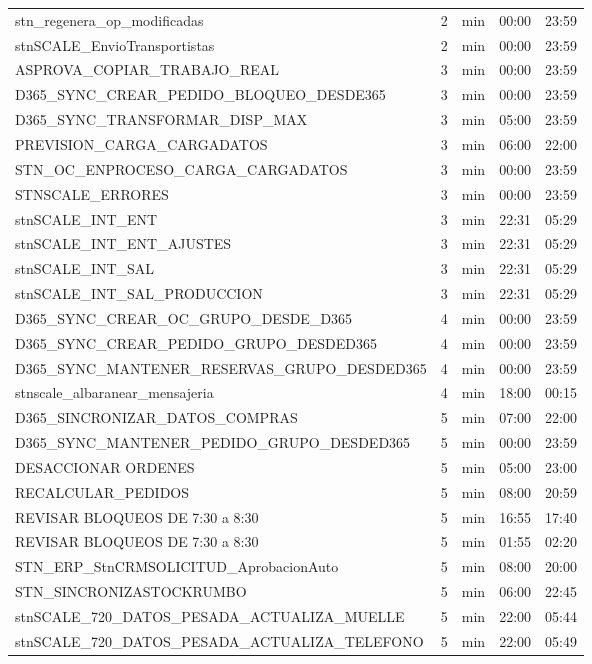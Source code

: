 \documentclass[11pt,a4paper]{article}
\begin{document}
\begin{longtable}{p{8.6cm}rp{1.3cm}p{1.6cm}p{1.6cm}}
stn\_regenera\_op\_modificadas & 2 & min & 00:00 & 23:59 \\
stnSCALE\_EnvioTransportistas & 2 & min & 00:00 & 23:59 \\
ASPROVA\_COPIAR\_TRABAJO\_REAL & 3 & min & 00:00 & 23:59 \\
D365\_SYNC\_CREAR\_PEDIDO\_BLOQUEO\_DESDE365 & 3 & min & 00:00 & 23:59 \\
D365\_SYNC\_TRANSFORMAR\_DISP\_MAX & 3 & min & 05:00 & 23:59 \\
PREVISION\_CARGA\_CARGADATOS & 3 & min & 06:00 & 22:00 \\
STN\_OC\_ENPROCESO\_CARGA\_CARGADATOS & 3 & min & 00:00 & 23:59 \\
STNSCALE\_ERRORES & 3 & min & 00:00 & 23:59 \\
stnSCALE\_INT\_ENT & 3 & min & 22:31 & 05:29 \\
stnSCALE\_INT\_ENT\_AJUSTES & 3 & min & 22:31 & 05:29 \\
stnSCALE\_INT\_SAL & 3 & min & 22:31 & 05:29 \\
stnSCALE\_INT\_SAL\_PRODUCCION & 3 & min & 22:31 & 05:29 \\
D365\_SYNC\_CREAR\_OC\_GRUPO\_DESDE\_D365 & 4 & min & 00:00 & 23:59 \\
D365\_SYNC\_CREAR\_PEDIDO\_GRUPO\_DESDED365 & 4 & min & 00:00 & 23:59 \\
D365\_SYNC\_MANTENER\_RESERVAS\_GRUPO\_DESDED365 & 4 & min & 00:00 & 23:59 \\
stnscale\_albaranear\_mensajeria & 4 & min & 18:00 & 00:15 \\
D365\_SINCRONIZAR\_DATOS\_COMPRAS & 5 & min & 07:00 & 22:00 \\
D365\_SYNC\_MANTENER\_PEDIDO\_GRUPO\_DESDED365 & 5 & min & 00:00 & 23:59 \\
DESACCIONAR ORDENES & 5 & min & 05:00 & 23:00 \\
RECALCULAR\_PEDIDOS & 5 & min & 08:00 & 20:59 \\
REVISAR BLOQUEOS DE 7:30 a 8:30 & 5 & min & 16:55 & 17:40 \\
REVISAR BLOQUEOS DE 7:30 a 8:30 & 5 & min & 01:55 & 02:20 \\
STN\_ERP\_StnCRMSOLICITUD\_AprobacionAuto & 5 & min & 08:00 & 20:00 \\
STN\_SINCRONIZASTOCKRUMBO & 5 & min & 06:00 & 22:45 \\
stnSCALE\_720\_DATOS\_PESADA\_ACTUALIZA\_MUELLE & 5 & min & 22:00 & 05:44 \\
stnSCALE\_720\_DATOS\_PESADA\_ACTUALIZA\_TELEFONO & 5 & min & 22:00 & 05:49 \\

\end{longtable}
\end{document}
